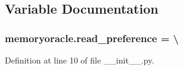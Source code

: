 \subsection{Variable Documentation}
\hypertarget{namespacememoryoracle_a5b6a7d01e361b06ca948d2b08c0ff10b}{}
\subsubsection[{read\+\_\+preference}]{\setlength{\rightskip}{0pt plus 5cm}memoryoracle.\+read\+\_\+preference = \textbackslash{}}\label{namespacememoryoracle_a5b6a7d01e361b06ca948d2b08c0ff10b}


Definition at line 10 of file \+\_\+\+\_\+init\+\_\+\+\_\+.\+py.

